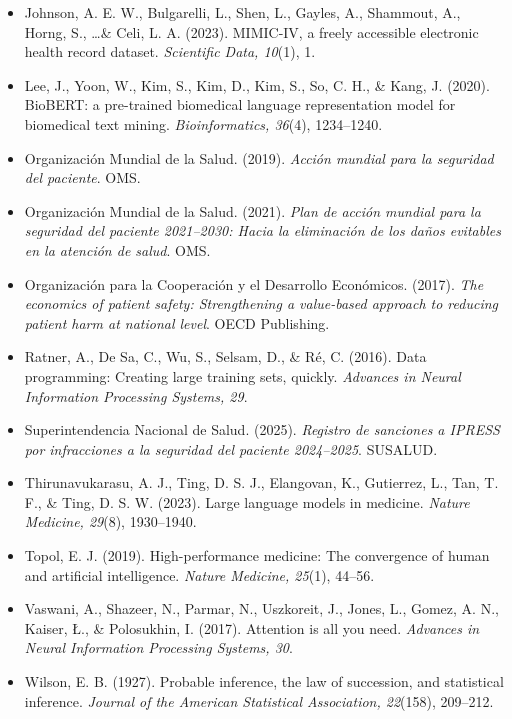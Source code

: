 \documentclass[12pt,a4paper,oneside]{book}
\begin{document}
\begin{itemize}[leftmargin=0pt,itemindent=0pt,itemsep=6pt,label={}]
\item Johnson, A. E. W., Bulgarelli, L., Shen, L., Gayles, A., Shammout, A., Horng, S., \ldots \& Celi, L. A. (2023). MIMIC-IV, a freely accessible electronic health record dataset. \textit{Scientific Data, 10}(1), 1.

\item Lee, J., Yoon, W., Kim, S., Kim, D., Kim, S., So, C. H., \& Kang, J. (2020). BioBERT: a pre-trained biomedical language representation model for biomedical text mining. \textit{Bioinformatics, 36}(4), 1234--1240.

\item Organización Mundial de la Salud. (2019). \textit{Acción mundial para la seguridad del paciente}. OMS.

\item Organización Mundial de la Salud. (2021). \textit{Plan de acción mundial para la seguridad del paciente 2021--2030: Hacia la eliminación de los daños evitables en la atención de salud}. OMS.

\item Organización para la Cooperación y el Desarrollo Económicos. (2017). \textit{The economics of patient safety: Strengthening a value-based approach to reducing patient harm at national level}. OECD Publishing.

\item Ratner, A., De Sa, C., Wu, S., Selsam, D., \& Ré, C. (2016). Data programming: Creating large training sets, quickly. \textit{Advances in Neural Information Processing Systems, 29}.

\item Superintendencia Nacional de Salud. (2025). \textit{Registro de sanciones a IPRESS por infracciones a la seguridad del paciente 2024--2025}. SUSALUD.

\item Thirunavukarasu, A. J., Ting, D. S. J., Elangovan, K., Gutierrez, L., Tan, T. F., \& Ting, D. S. W. (2023). Large language models in medicine. \textit{Nature Medicine, 29}(8), 1930--1940.

\item Topol, E. J. (2019). High-performance medicine: The convergence of human and artificial intelligence. \textit{Nature Medicine, 25}(1), 44--56.

\item Vaswani, A., Shazeer, N., Parmar, N., Uszkoreit, J., Jones, L., Gomez, A. N., Kaiser, \L., \& Polosukhin, I. (2017). Attention is all you need. \textit{Advances in Neural Information Processing Systems, 30}.

\item Wilson, E. B. (1927). Probable inference, the law of succession, and statistical inference. \textit{Journal of the American Statistical Association, 22}(158), 209--212.

\end{itemize}
\end{document}
